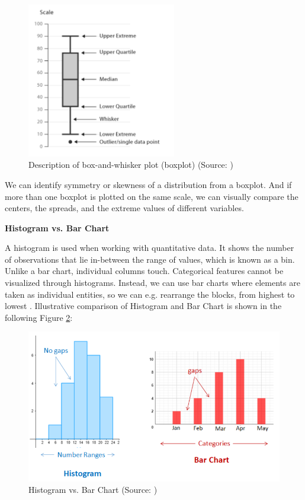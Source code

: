 \documentclass[a4paper,10pt,twoside]{article}
\begin{document}
\vspace{0.3cm}
\begin{figure}[hbt!]
\begin{center}
\includegraphics[width=6.5cm]{../pictures/boxplot.png}
\caption[Description of box-and-whisker plot (boxplot)]{Description of box-and-whisker plot (boxplot) (Source: \cite{heroku})}
\label{fig:boxplot}
\end{center}
\end{figure}

\noindent We can identify symmetry or skewness of a distribution from a boxplot. And if more than one boxplot is plotted on the same scale, we can visually compare the centers, the spreads, and the extreme values of different variables.

\bigskip
\noindent \textbf {Histogram vs. Bar Chart}

\noindent A histogram is used when working with quantitative data. It shows the number of observations that lie in-between the range of values, which is known as a bin. Unlike a bar chart, individual columns touch. Categorical features cannot be visualized through histograms. Instead, we can use bar charts where elements are taken as individual entities, so we can e.g. rearrange the blocks, from highest to lowest \cite{OnlineMathLearning}. Illustrative comparison of Histogram and Bar Chart is shown in the following Figure \ref{fig:histogram_barchart}:

\vspace{0.3cm}
\begin{figure}[hbt!]
\begin{center}
\includegraphics[width=12.5cm]{../pictures/histogram_barchart.png}
\caption[Histogram vs. Bar Chart (boxplot)]{Histogram vs. Bar Chart (Source: \cite{OnlineMathLearning})}
\label{fig:histogram_barchart}
\end{center}
\end{figure}
\end{document}

